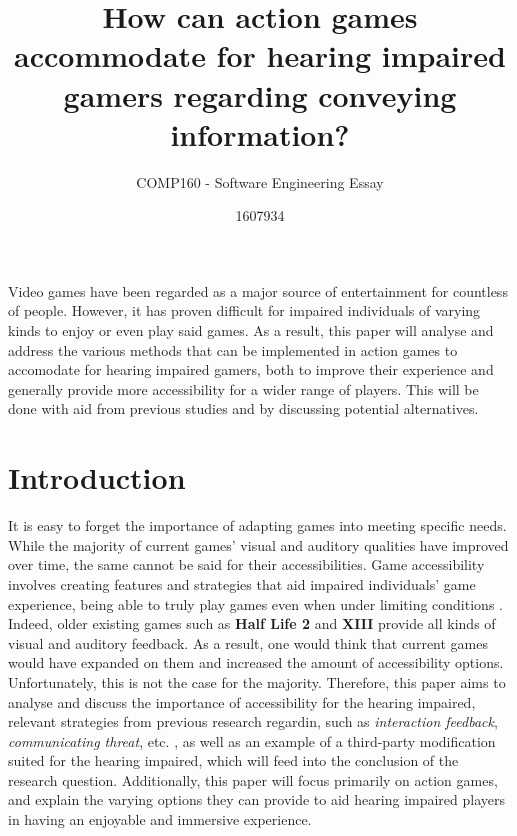 \documentclass{scrartcl}
\title{How can action games accommodate for hearing impaired gamers regarding conveying information?}
\subtitle{COMP160 - Software Engineering Essay}
\author{1607934}
\begin{document}
\maketitle

\abstract
Video games have been regarded as a major source of entertainment for countless of people. However, it has proven difficult for impaired individuals of varying kinds to enjoy or even play said games. As a result, this paper will analyse and address the various methods that can be implemented in action games to accomodate for hearing impaired gamers, both to improve their experience and generally provide more accessibility for a wider range of players. This will be done with aid from previous studies and by discussing potential alternatives.

\section{Introduction}
It is easy to forget the importance of adapting games into meeting specific needs. While the majority of current games' visual and auditory qualities have improved over time, the same cannot be said for their accessibilities. Game accessibility involves creating features and strategies that aid impaired individuals' game experience, being able to truly play games even when under limiting conditions \cite{Bierre}. Indeed, older existing games such as \textbf{Half Life 2} and \textbf{XIII} provide all kinds of visual and auditory feedback. \cite{Denise} As a result, one would think that current games would have expanded on them and increased the amount of accessibility options. Unfortunately, this is not the case for the majority. Therefore, this paper aims to analyse and discuss the importance of accessibility for the hearing impaired, relevant strategies from previous research regardin, such as \textit{interaction feedback}, \textit{communicating threat}, etc. \cite{Denise}, as well as an example of a third-party modification suited for the hearing impaired, which will feed into the conclusion of the research question. Additionally, this paper will focus primarily on action games, and explain the varying options they can provide to aid hearing impaired players in having an enjoyable and immersive experience.
\end{document}
